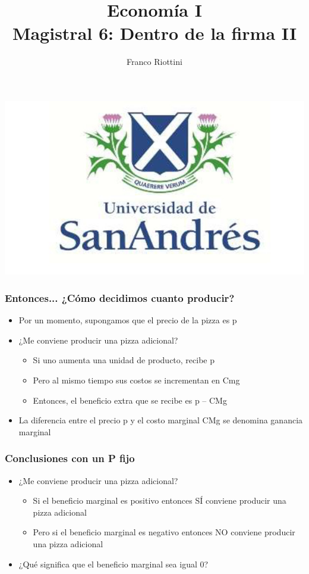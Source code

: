 \documentclass{beamer}
\title[Economía I]{Economía I \vspace{4mm}
\\ Magistral 6: Dentro de la firma II}
\date{}
\author[Riottini]{Franco Riottini}
\institute[]{Universidad de San Andrés}
\begin{document}
\begin{frame}
\titlepage
\centering
\includegraphics[scale=0.2]{../Figures/logoUDESA.jpg} 
\end{frame}



\begin{frame}
\frametitle{Entonces... ¿Cómo decidimos cuanto producir?}
\begin{itemize}
    \item Por un momento, supongamos que el precio de la pizza es p
        \item ¿Me conviene producir una pizza adicional?     
    \begin{itemize}
        \item Si uno aumenta una unidad de producto, recibe p
        \item Pero al mismo tiempo sus costos se incrementan en Cmg
        \item Entonces, el beneficio extra que se recibe es p – CMg
        \end{itemize}
    \item La diferencia entre el precio p y el costo marginal CMg se denomina ganancia marginal
\end{itemize}
\end{frame}

\begin{frame}
\frametitle{Conclusiones con un P fijo}
\begin{itemize}
    \item ¿Me conviene producir una pizza adicional?
        \begin{itemize}
        \item Si el beneficio marginal es positivo entonces SÍ conviene producir una pizza adicional
        \item Pero si el beneficio marginal es negativo entonces NO conviene producir una pizza adicional
        \end{itemize} 
    \item ¿Qué significa que el beneficio marginal sea igual 0?
\end{itemize}
\end{frame}
\end{document}
